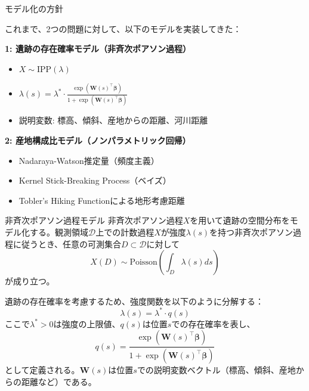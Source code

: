 \documentclass[xelatex, 8pt]{beamer}
\theoremstyle{plain}
\theoremstyle{definition}
\begin{document}
\begin{frame}{モデル化の方針}

    これまで、2つの問題に対して、以下のモデルを実装してきた：

    \vspace{3mm}

    \textbf{1: 遺跡の存在確率モデル（非斉次ポアソン過程）}
    \begin{itemize}
        \item $X \sim \text{IPP}(\lambda)$
        \item $\lambda(s) = \lambda^*　\cdot　\frac{\exp(\boldsymbol{W}(s)^\top \boldsymbol{\beta})}{1 + \exp(\boldsymbol{W}(s)^\top \boldsymbol{\beta})}$
        \item 説明変数: 標高、傾斜、産地からの距離、河川距離
    \end{itemize}

    \vspace{3mm}

    \textbf{2: 産地構成比モデル（ノンパラメトリック回帰）}
    \begin{itemize}
        \item Nadaraya-Watson推定量（頻度主義）
        \item Kernel Stick-Breaking Process（ベイズ）
        \item Tobler's Hiking Functionによる地形考慮距離
    \end{itemize}
\end{frame}

\begin{frame}{非斉次ポアソン過程モデル}
    非斉次ポアソン過程$X$を用いて遺跡の空間分布をモデル化する。観測領域$\mathcal{D}$上での計数過程$X$が強度$\lambda(s)$を持つ非斉次ポアソン過程に従うとき、任意の可測集合$D \subset \mathcal{D}$に対して
    $$X(D) \sim \text{Poisson}\left(\int_D \lambda(s) ds\right)$$
    が成り立つ。

    遺跡の存在確率を考慮するため、強度関数を以下のように分解する：
    $$\lambda(s) = \lambda^* \cdot q(s)$$
    ここで$\lambda^* > 0$は強度の上限値、$q(s)$は位置$s$での存在確率を表し、
    $$q(s) = \frac{\exp(\boldsymbol{W}(s)^\top \boldsymbol{\beta})}{1 + \exp(\boldsymbol{W}(s)^\top \boldsymbol{\beta})}$$
    として定義される。$\boldsymbol{W}(s)$は位置$s$での説明変数ベクトル（標高、傾斜、産地からの距離など）である。
\end{frame}
\end{document}
